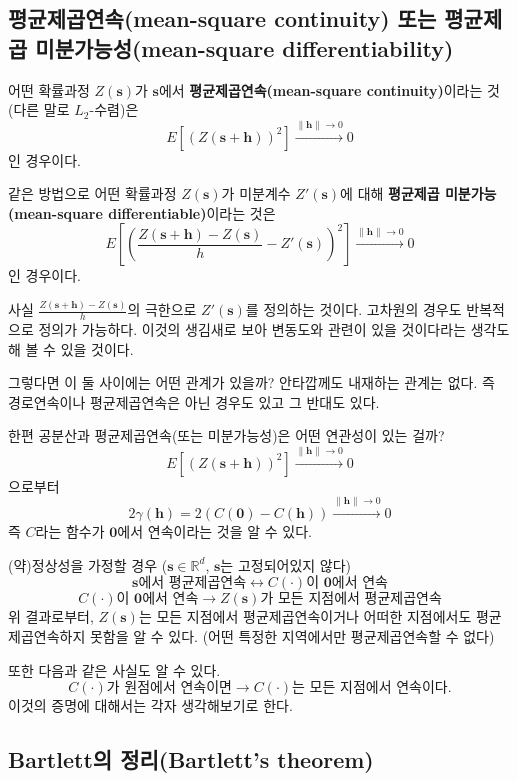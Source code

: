 \documentclass[b5paper,]{scrbook}
\theoremstyle{plain}
\theoremstyle{definition}
\numberwithin{equation}{section}
\begin{document}
\subsection{평균제곱연속(mean-square continuity) 또는 평균제곱
미분가능성(mean-square
differentiability)}\label{mean-square-continuity---mean-square-differentiability}

어떤 확률과정 \(Z(\mathbf{s})\)가 \(\mathbf{s}\)에서
\textbf{평균제곱연속(mean-square continuity)}이라는 것(다른 말로
\(L_{2}\)-수렴)은
\[E[(Z(\mathbf{s}+\mathbf{h}))^{2}] \stackrel{\|\mathbf{h}\| \rightarrow 0}{\rightarrow} 0\]
인 경우이다.

같은 방법으로 어떤 확률과정 \(Z(\mathbf{s})\)가 미분계수
\(Z'(\mathbf{s})\)에 대해 \textbf{평균제곱 미분가능(mean-square
differentiable)}이라는 것은
\[E[(\frac{Z(\mathbf{s}+\mathbf{h})-Z(\mathbf{s})}{h}-Z'(\mathbf{s}))^{2}] \stackrel{\|\mathbf{h}\| \rightarrow 0}{\rightarrow} 0\]
인 경우이다.

사실 \(\frac{Z(\mathbf{s}+\mathbf{h})-Z(\mathbf{s})}{h}\)의 극한으로
\(Z'(\mathbf{s})\)를 정의하는 것이다. 고차원의 경우도 반복적으로 정의가
가능하다. 이것의 생김새로 보아 변동도와 관련이 있을 것이다라는 생각도 해
볼 수 있을 것이다.

그렇다면 이 둘 사이에는 어떤 관계가 있을까? 안타깝께도 내재하는 관계는
없다. 즉 경로연속이나 평균제곱연속은 아닌 경우도 있고 그 반대도 있다.

한편 공분산과 평균제곱연속(또는 미분가능성)은 어떤 연관성이 있는 걸까?
\[E[(Z(\mathbf{s}+\mathbf{h}))^{2}] \stackrel{\|\mathbf{h}\| \rightarrow 0}{\rightarrow} 0\]
으로부터
\[2\gamma(\mathbf{h})=2(C(\mathbf{0})-C(\mathbf{h})) \stackrel{\|\mathbf{h}\| \rightarrow 0}{\rightarrow} 0\]
즉 \(C\)라는 함수가 \(\mathbf{0}\)에서 연속이라는 것을 알 수 있다.

(약)정상성을 가정할 경우 (\(\mathbf{s} \in \mathbb{R}^{d}\),
\(\mathbf{s}\)는 고정되어있지 않다)
\[ \mathbf{s} \text{에서 평균제곱연속} \leftrightarrow C(\cdot)\text{이 } \mathbf{0}\text{에서 연속}\]
\[C(\cdot)\text{이 } \mathbf{0}\text{에서 연속} \rightarrow Z(\mathbf{s})\text{가 모든 지점에서 평균제곱연속}\]
위 결과로부터, \(Z(\mathbf{s})\)는 모든 지점에서 평균제곱연속이거나
어떠한 지점에서도 평균제곱연속하지 못함을 알 수 있다. (어떤 특정한
지역에서만 평균제곱연속할 수 없다)

또한 다음과 같은 사실도 알 수 있다.
\[C(\cdot) \text{가 원점에서 연속이면} \rightarrow C(\cdot) \text{는 모든 지점에서 연속이다}.\]
이것의 증명에 대해서는 각자 생각해보기로 한다.

\subsection{Bartlett의 정리(Bartlett's
theorem)}\label{bartlett-bartletts-theorem}
\end{document}
